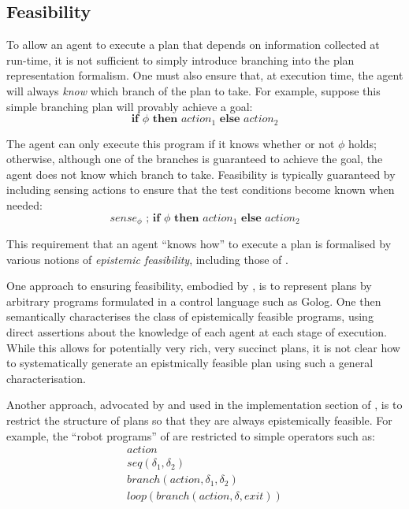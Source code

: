 \subsection{Feasibility\label{sec:JointExec:BG:Feasibility}}

To allow an agent to execute a plan that depends on information collected
at run-time, it is not sufficient to simply introduce branching into
the plan representation formalism. One must also ensure that, at execution
time, the agent will always \emph{know} which branch of the plan to
take. For example, suppose this simple branching plan will provably
achieve a goal:\[
\mathbf{if}\,\,\phi\,\,\mathbf{then}\,\, action_{1}\,\,\mathbf{else\,}\, action_{2}\]


The agent can only execute this program if it knows whether or not
$\phi$ holds; otherwise, although one of the branches is guaranteed
to achieve the goal, the agent does not know which branch to take.
Feasibility is typically guaranteed by including sensing actions to
ensure that the test conditions become known when needed:\[
sense_{\phi}\,\,;\,\mathbf{if\,}\,\phi\,\,\mathbf{then}\,\, action_{1}\,\,\mathbf{else\,}\, action_{2}\]


This requirement that an agent {}``knows how'' to execute a plan
is formalised by various notions of \emph{epistemic feasibility},
including those of \citep{levesque98what_robots_can_do,levesque00knowing_how,Lesperance01epi_feas_casl,giacomo04sem_delib_indigolog,baier06programs_that_sense}.

One approach to ensuring feasibility, embodied by \citep{levesque00knowing_how,giacomo04sem_delib_indigolog,baier06programs_that_sense},
is to represent plans by arbitrary programs formulated in a control
language such as Golog. One then semantically characterises the class
of epistemically feasible programs, using direct assertions about
the knowledge of each agent at each stage of execution. While this
allows for potentially very rich, very succinct plans, it is not clear
how to systematically generate an epistmically feasible plan using
such a general characterisation.

Another approach, advocated by \citep{levesque96what_is_planning,levesque98what_robots_can_do}
and used in the implementation section of \citep{giacomo04sem_delib_indigolog},
is to restrict the structure of plans so that they are always epistemically
feasible. For example, the {}``robot programs'' of \citep{levesque98what_robots_can_do}
are restricted to simple operators such as:\begin{gather*}
action\\
seq(\delta_{1},\delta_{2})\\
branch(action,\delta_{1},\delta_{2})\\
loop(branch(action,\delta,exit))\end{gather*}


